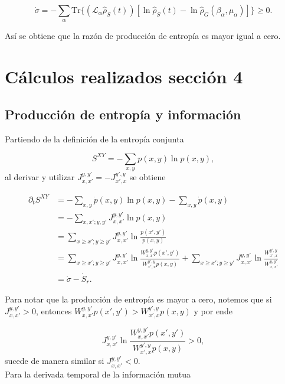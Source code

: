 \begin{appendixs}
\begin{equation*}
    \dot{\sigma} = - \sum_{\alpha} \text{Tr}\{(\mathcal{L}_{\alpha}\hat{\rho}_{S}(t)) [\ln \hat{\rho}_{S}(t) -\ln \hat{\rho}_{G}(\beta_{\alpha},\mu_{\alpha}) ] \} \geq 0.
\end{equation*}

Así se obtiene que la razón de producción de entropía es mayor igual a cero.

\label{apendix:thermolaws}

\newpage 

    \section{Cálculos realizados sección 4}
    \subsection{Producción de entropía y información}
    Partiendo de la definición de la entropía conjunta

    \begin{equation*}
        S^{XY} = - \sum_{x,y}p(x,y) \ln p(x,y),
    \end{equation*}
al derivar y utilizar $J_{x,x'}^{y,y'} = - J_{x',x}^{y',y}$ se obtiene

    \begin{align*}
        \partial_{t}S^{XY} & = - \sum_{x,y} \dot{p}(x,y) \ln p(x,y) - \sum_{x,y} \dot{p}(x,y) \\
                           & = - \sum_{x,x';y,y'} J_{x,x'}^{y,y'} \ln p(x,y)  \\
                           & = \sum_{x \geq x'; y\geq y'} J_{x,x'}^{y,y'} \ln \frac{p(x',y')}{p(x,y)} \\
                           & = \sum_{x \geq x'; y\geq y'} J_{x,x'}^{y,y'} \ln \frac{W_{x,x'}^{y,y'} p(x',y')}{W_{x',x}^{y',y} p(x,y)} +  \sum_{x \geq x'; y\geq y'} J_{x,x'}^{y,y'} \ln \frac{W_{x',x}^{y',y} }{W_{x,x'}^{y,y'} } \\
                           & = \dot{\sigma} - \dot{S}_{r}.
    \end{align*}

Para notar que la producción de entropía es mayor a cero, notemos que si $J_{x,x'}^{y,y'} > 0$, entonces $W_{x,x'}^{y,y'}p(x',y') > W_{x',x}^{y',y}p(x,y) $  y por ende

\begin{equation*}
    J_{x,x'}^{y,y'} \ln \frac{ W_{x,x'}^{y,y'}p(x',y') }{ W_{x',x}^{y',y}p(x,y) } > 0,
\end{equation*}
sucede de manera similar si $J_{x,x'}^{y,y'}<0$.\\
 Para la derivada temporal de la información mutua 


\end{appendixs}
